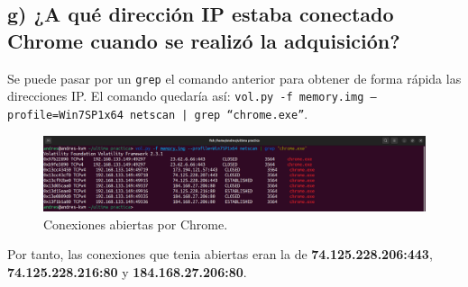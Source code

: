 \documentclass{article}
\begin{document}
\subsection{g) ¿A qué dirección IP estaba conectado Chrome cuando se realizó la adquisición?}

Se puede pasar por un \verb|grep| el comando anterior para obtener de forma rápida las direcciones IP. El comando quedaría así: \texttt{vol.py -f memory.img --profile=Win7SP1x64 netscan | grep ``chrome.exe''}.

\begin{figure}[H]
    \centering
    \includegraphics[width=\textwidth]{imagenes/Captura desde 2022-12-07 10-17-28.png}
    \caption{Conexiones abiertas por Chrome.}
\end{figure}

Por tanto, las conexiones que tenia abiertas eran la de \textbf{74.125.228.206:443}, \textbf{74.125.228.216:80} y \textbf{184.168.27.206:80}.
\end{document}
